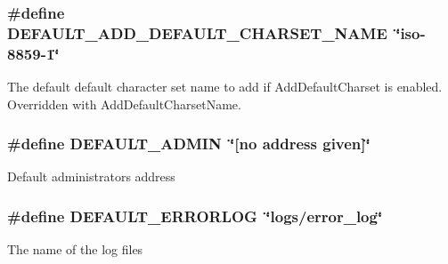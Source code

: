\subsubsection[{\texorpdfstring{D\+E\+F\+A\+U\+L\+T\+\_\+\+A\+D\+D\+\_\+\+D\+E\+F\+A\+U\+L\+T\+\_\+\+C\+H\+A\+R\+S\+E\+T\+\_\+\+N\+A\+ME}{DEFAULT_ADD_DEFAULT_CHARSET_NAME}}]{\setlength{\rightskip}{0pt plus 5cm}\#define D\+E\+F\+A\+U\+L\+T\+\_\+\+A\+D\+D\+\_\+\+D\+E\+F\+A\+U\+L\+T\+\_\+\+C\+H\+A\+R\+S\+E\+T\+\_\+\+N\+A\+ME~\char`\"{}iso-\/8859-\/1\char`\"{}}\hypertarget{group__APACHE__CORE__DAEMON_gaf5ce507d0fcb36e6129cc2aec6cac122}{}\label{group__APACHE__CORE__DAEMON_gaf5ce507d0fcb36e6129cc2aec6cac122}
The default default character set name to add if Add\+Default\+Charset is enabled. Overridden with Add\+Default\+Charset\+Name. 
\subsubsection[{\texorpdfstring{D\+E\+F\+A\+U\+L\+T\+\_\+\+A\+D\+M\+IN}{DEFAULT_ADMIN}}]{\setlength{\rightskip}{0pt plus 5cm}\#define D\+E\+F\+A\+U\+L\+T\+\_\+\+A\+D\+M\+IN~\char`\"{}\mbox{[}no {\bf address} {\bf given}\mbox{]}\char`\"{}}\hypertarget{group__APACHE__CORE__DAEMON_gaa01f09b9d40369ba1f14b88005897d5f}{}\label{group__APACHE__CORE__DAEMON_gaa01f09b9d40369ba1f14b88005897d5f}
Default administrator\textquotesingle{}s address 
\subsubsection[{\texorpdfstring{D\+E\+F\+A\+U\+L\+T\+\_\+\+E\+R\+R\+O\+R\+L\+OG}{DEFAULT_ERRORLOG}}]{\setlength{\rightskip}{0pt plus 5cm}\#define D\+E\+F\+A\+U\+L\+T\+\_\+\+E\+R\+R\+O\+R\+L\+OG~\char`\"{}logs/error\+\_\+log\char`\"{}}\hypertarget{group__APACHE__CORE__DAEMON_ga6a9ad3e96d60dc6c82112be50b73bbb4}{}\label{group__APACHE__CORE__DAEMON_ga6a9ad3e96d60dc6c82112be50b73bbb4}
The name of the log files 
